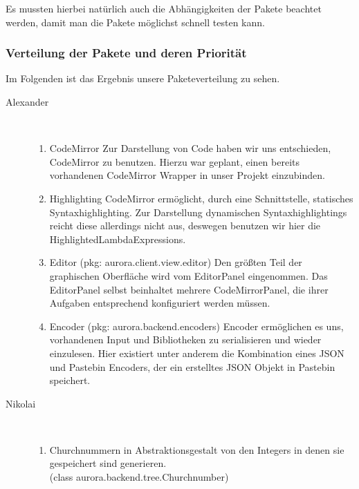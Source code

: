 \documentclass[parskip=full,11pt,twoside]{scrartcl}
\begin{document}
Es mussten hierbei natürlich auch die Abhängigkeiten der Pakete beachtet werden, damit man die Pakete möglichst schnell testen kann.


\subsubsection{Verteilung der Pakete und deren Priorität}
Im Folgenden ist das Ergebnis unsere Paketeverteilung zu sehen.
\begin{description}


    \item [Alexander]\hfill \\
    \begin{enumerate}
        \item CodeMirror
            \newline
            Zur Darstellung von Code haben wir uns entschieden, CodeMirror zu benutzen.
            Hierzu war geplant, einen bereits vorhandenen CodeMirror Wrapper in unser Projekt einzubinden.
        \item Highlighting
            \newline
            CodeMirror ermöglicht, durch eine Schnittstelle, statisches Syntaxhighlighting.
            Zur Darstellung dynamischen Syntaxhighlightings reicht diese allerdings nicht aus, deswegen benutzen wir hier die HighlightedLambdaExpressions.
        \item Editor (pkg: aurora.client.view.editor)
            \newline
            Den größten Teil der graphischen Oberfläche wird vom EditorPanel eingenommen.
            Das EditorPanel selbst beinhaltet mehrere CodeMirrorPanel, die ihrer Aufgaben entsprechend konfiguriert werden müssen.
        \item Encoder (pkg: aurora.backend.encoders)
            \newline
            Encoder ermöglichen es uns, vorhandenen Input und Bibliotheken zu serialisieren und wieder einzulesen.
            Hier existiert unter anderem die Kombination eines JSON und Pastebin Encoders, der ein erstelltes JSON Objekt in Pastebin speichert.
    \end{enumerate}
    \item [Nikolai]\hfill \\
    \begin{enumerate}
    \item Churchnummern in Abstraktionsgestalt von den Integers in denen sie gespeichert sind generieren. \\(class aurora.backend.tree.Churchnumber)

\end{enumerate}
\end{description}
\end{document}
